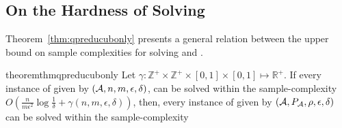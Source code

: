 \subsection{On the Hardness of Solving \protect\QP}
\label{subsec:qpreducub}

Theorem~\ref{thm:qpreducubonly} presents a general relation between the upper bound on 
sample complexities for solving \QF and \QP.
 

%


\begin{restatable}{theorem}{thmqpreducubonly}
\label{thm:qpreducubonly}
Let $\gamma: \mathbb{Z}^+ \times \mathbb{Z}^+ \times [0,1] \times [0,1] \mapsto \mathbb{R}^+$.
If every instance of \QF  given by $(\mathcal{A}, n, m, \epsilon, \delta)$, can be solved
within the sample-complexity $O\left(\frac{n}{m\epsilon^2}\log\frac{1}{\delta} + \gamma(n,m,\epsilon,\delta)\right)$, 
then,
every instance of \QP  given by $(\mathcal{A}, P_{\mathcal{A}}, \rho, \epsilon, \delta)$ can be solved
within the sample-complexity  
\end{restatable}


